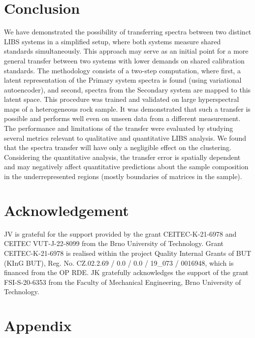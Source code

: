 \documentclass[preprint,11pt]{elsarticle}
\begin{document}
\section{Conclusion}
\label{sec:Concl}
\noindent
We have demonstrated the possibility of transferring spectra between two distinct LIBS systems in a simplified setup, where both systems measure shared standards simultaneously. This approach may serve as an initial point for a more general transfer between two systems with lower demands on shared calibration standards. The methodology consists of a two-step computation, where first, a latent representation of the Primary system spectra is found (using variational autoencoder), and second, spectra from the Secondary system are mapped to this latent space. This procedure was trained and validated on large hyperspectral maps of a heterogeneous rock sample. It was demonstrated that such a transfer is possible and performs well even on unseen data from a different measurement. The performance and limitations of the transfer were evaluated by studying several metrics relevant to qualitative and quantitative LIBS analysis. We found that the spectra transfer will have only a negligible effect on the clustering. Considering the quantitative analysis, the transfer error is spatially dependent and may negatively affect quantitative predictions about the sample composition in the underrepresented regions (mostly boundaries of matrices in the sample). 



\section{Acknowledgement}
\label{sec:Ack}
\noindent
JV is grateful for the support provided by the grant CEITEC-K-21-6978 and CEITEC VUT-J-22-8099 from the Brno University of Technology. Grant CEITEC-K-21-6978 is realised within the project Quality Internal Grants of BUT (KInG BUT), Reg. No. CZ.02.2.69 / 0.0 / 0.0 / 19\_073 / 0016948, which is financed from the OP RDE. JK gratefully acknowledges the support of the grant FSI-S-20-6353 from the Faculty of Mechanical Engineering, Brno University of Technology. 


 


\appendix
\newpage

\section{Appendix}
\label{sec:appendix}
\end{document}
